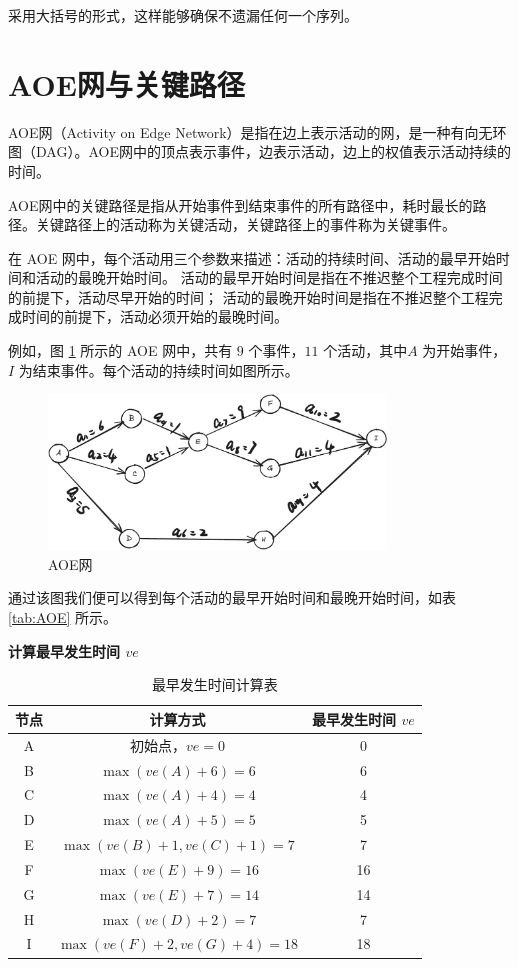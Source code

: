 \documentclass[lang=cn,newtx,10pt,scheme=chinese]{../elegantbook}
\begin{document}
采用大括号的形式，这样能够确保不遗漏任何一个序列。
\section{AOE网与关键路径}

AOE网（Activity on Edge Network）是指在边上表示活动的网，是一种有向无环图（DAG）。AOE网中的顶点表示事件，边表示活动，边上的权值表示活动持续的时间。

AOE网中的关键路径是指从开始事件到结束事件的所有路径中，耗时最长的路径。关键路径上的活动称为关键活动，关键路径上的事件称为关键事件。

在 AOE 网中，每个活动用三个参数来描述：活动的持续时间、活动的最早开始时间和活动的最晚开始时间。
活动的最早开始时间是指在不推迟整个工程完成时间的前提下，活动尽早开始的时间；
活动的最晚开始时间是指在不推迟整个工程完成时间的前提下，活动必须开始的最晚时间。

例如，图 \ref{fig:AOE} 所示的 AOE 网中，共有 $9$ 个事件，$11$ 个活动，其中$A$ 为开始事件，$I$ 为结束事件。每个活动的持续时间如图所示。

\begin{figure}[h!]
  \centering
  \includegraphics[width=0.8\textwidth]{./figure/pdf/cropped/AOE.pdf}
  \caption{AOE网}
  \label{fig:AOE}
\end{figure}

通过该图我们便可以得到每个活动的最早开始时间和最晚开始时间，如表 \ref{tab:AOE} 所示。

\textbf{计算最早发生时间 $ve$}
\begin{table}[h]
    \centering
    \begin{tabular}{c|c|c}
        \toprule
        \textbf{节点} & \textbf{计算方式} & \textbf{最早发生时间 $ve$} \\
        \midrule
        A & 初始点，$ve=0$ & 0 \\
        B & $\max(ve(A) + 6) = 6$ & 6 \\
        C & $\max(ve(A) + 4) = 4$ & 4 \\
        D & $\max(ve(A) + 5) = 5$ & 5 \\
        E & $\max(ve(B) + 1, ve(C) + 1) = 7$ & 7 \\
        F & $\max(ve(E) + 9) = 16$ & 16 \\
        G & $\max(ve(E) + 7) = 14$ & 14 \\
        H & $\max(ve(D) + 2) = 7$ & 7 \\
        I & $\max(ve(F) + 2, ve(G) + 4) = 18$ & 18 \\
        \bottomrule
    \end{tabular}
    \caption{最早发生时间计算表}
\end{table}
\end{document}

